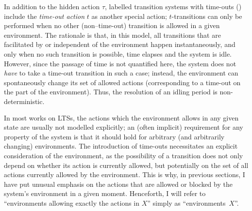 %
\begin{isabellebody}%
%
%
\isadelimtheory
%
\endisadelimtheory
%
\isatagtheory
%
\endisatagtheory
{\isafoldtheory}%
%
\isadelimtheory
%
\endisadelimtheory
%
\isadelimdocument
%
\endisadelimdocument
%
\isatagdocument
%
\isamarkuptrue%
%
\endisatagdocument
{\isafolddocument}%
%
\isadelimdocument
%
\endisadelimdocument
%
\begin{isamarkuptext}%
\label{sec:LTSt}%
\end{isamarkuptext}\isamarkuptrue%
%
\begin{isamarkuptext}%
In addition to the hidden action $\tau$, labelled transition systems with time-outs (\LTSt{}) \cite{vanglabbeek2021failure} include the \emph{time-out action} $t$ as another special action; $t$-transitions can only be performed when no other (non--time-out) transition is allowed in a given environment. The rationale is that, in this model, all transitions that are facilitated by or independent of the environment happen instantaneously, and only when no such transition is possible, time elapses and the system is idle.
However, since the passage of time is not quantified here, the system does not \emph{have} to take a time-out transition in such a case; instead, the environment can spontaneously change its set of allowed actions (corresponding to a time-out on the part of the environment). Thus, the resolution of an idling period is non-deterministic.

In most works on LTSs, the actions which the environment allows in any given state are usually not modelled explicitly; an (often implicit) requirement for any property of the system is that it should hold for arbitrary (and arbitrarily changing) environments. The introduction of time-outs necessitates an explicit consideration of the environment, as the possibility of a transition does not only depend on whether its action is currently allowed, but potentially on the set of all actions currently allowed by the environment. This is why, in previous sections, I have put unusual emphasis on the actions that are allowed or blocked by the system's environment in a given moment. Henceforth, I will refer to \enquote{environments allowing exactly the actions in $X$} simply as \enquote{environments~$X$}.

\end{isamarkuptext}
\end{isabellebody}
